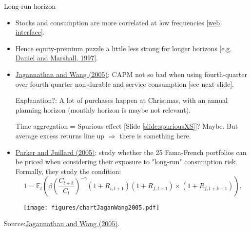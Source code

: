 \begin{frame}{Long-run horizon}
\begin{scriptsize}
\begin{itemize}
	\item Stocks and consumption are more correlated at low frequencies [\href{https://jrenne.shinyapps.io/APModels}{web interface}].
	\item Hence equity-premium puzzle a little less strong for longer horizons [e.g. \href{http://journals.cambridge.org/action/displayAbstract?fromPage=online&aid=286196&fileId=S1365100597003076}{Daniel and Marshall, 1997}].
	\item \href{http://www.nber.org/papers/w11026}{Jagannathan and Wang (2005)}: CAPM not so bad when using fourth-quarter over fourth-quarter non-durable and service consumption [see next slide].
	
	\vspace{.2cm}
	Explanation?: A lot of purchases happen at Christmas, with an annual planning horizon (monthly horizon is maybe not relevant).
	
	\vspace{.2cm}
	Time aggregation = Spurious effect [Slide \ref{slide:spuriousXS}]? Maybe. But average excess returns line up  $\Rightarrow$ there is something here.
	
	\vspace{.2cm}
	\item \href{http://www.nber.org/papers/w9538}{Parker and Juillard (2005)}: study whether the 25 Fama-French portfolios can be priced when considering their exposure to "long-run" consumption risk. Formally, they study the condition:
	$$
	1 = \mathbb{E}_t \left( \beta \left(\frac{C_{t+k}}{C_t}\right)^{- \gamma} (1 + R_{i,t+1})(1 + R_{f,t+1})\times (1 + R_{f,t+k-1}) \right).
	$$
\end{itemize}
\end{scriptsize}
\end{frame}


\begin{frame}
\begin{footnotesize}
		\begin{figure}
			\texttt{[image: figures/chartJaganWang2005.pdf]}
		\end{figure}
		\begin{tiny}
		\begin{center}
		Source:\href{http://www.nber.org/papers/w11026}{Jagannathan and Wang (2005)}.
		\end{center}
		\end{tiny}
\end{footnotesize}
\end{frame}



